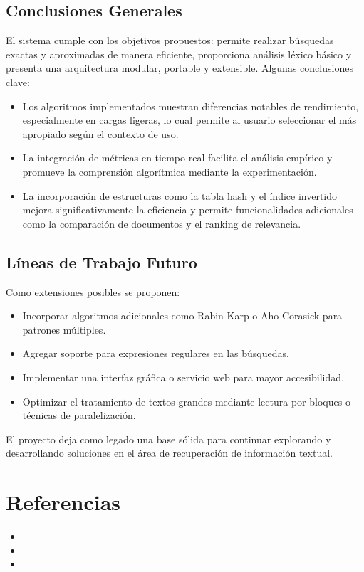 \documentclass[9pt,letterpaper,onecolumn]{rho-class/rho}
\begin{document}

\subsection{Conclusiones Generales}

El sistema cumple con los objetivos propuestos: permite realizar búsquedas exactas y aproximadas de manera eficiente, proporciona análisis léxico básico y presenta una arquitectura modular, portable y extensible. Algunas conclusiones clave:

\begin{itemize}
    \item Los algoritmos implementados muestran diferencias notables de rendimiento, especialmente en cargas ligeras, lo cual permite al usuario seleccionar el más apropiado según el contexto de uso.
    \item La integración de métricas en tiempo real facilita el análisis empírico y promueve la comprensión algorítmica mediante la experimentación.
    \item La incorporación de estructuras como la tabla hash y el índice invertido mejora significativamente la eficiencia y permite funcionalidades adicionales como la comparación de documentos y el ranking de relevancia.
\end{itemize}

\subsection{Líneas de Trabajo Futuro}

Como extensiones posibles se proponen:

\begin{itemize}
    \item Incorporar algoritmos adicionales como Rabin-Karp o Aho-Corasick para patrones múltiples.
    \item Agregar soporte para expresiones regulares en las búsquedas.
    \item Implementar una interfaz gráfica o servicio web para mayor accesibilidad.
    \item Optimizar el tratamiento de textos grandes mediante lectura por bloques o técnicas de paralelización.
\end{itemize}

El proyecto deja como legado una base sólida para continuar explorando y desarrollando soluciones en el área de recuperación de información textual.


\section{Referencias}
\begin{itemize}
    \item 
    \item 
    \item 
\end{itemize}
\end{document}
